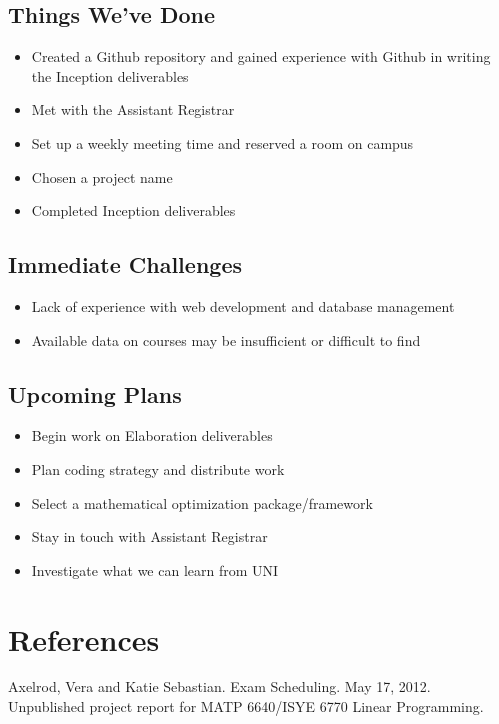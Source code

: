 \documentclass[11pt]{article}
\begin{document}
\subsection{Things We've Done}
\begin{itemize}
\item Created a Github repository and gained experience with Github in writing the Inception deliverables
\item Met with the Assistant Registrar
\item Set up a weekly meeting time and reserved a room on campus
\item Chosen a project name
\item Completed Inception deliverables
\end{itemize}

\subsection{Immediate Challenges} %
\begin{itemize}
\item Lack of experience with web development and database management
\item Available data on courses may be insufficient or difficult to find
\end{itemize}

\subsection{Upcoming Plans}
\begin{itemize}
\item Begin work on Elaboration deliverables
\item Plan coding strategy and distribute work
\item Select a mathematical optimization package/framework
\item Stay in touch with Assistant Registrar
\item Investigate what we can learn from UNI
\end{itemize}

\section*{References}

\hspace{0.25in}Axelrod, Vera and Katie Sebastian. Exam Scheduling. May 17, 2012. Unpublished project report for MATP 6640/ISYE 6770 Linear Programming. \\
\end{document}
